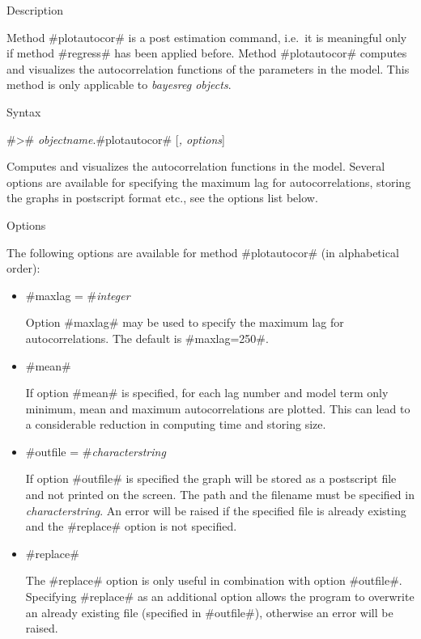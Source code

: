 \begin{stanza}{Description}

Method #plotautocor# is a post estimation command, i.e.~it is
meaningful only if method #regress# has been applied before.
Method #plotautocor# computes and visualizes the autocorrelation
functions of the parameters in the model. This method is only
applicable to {\em bayesreg objects}.

\end{stanza}

\begin{stanza}{Syntax}

#># {\em objectname}.#plotautocor# [{\em , options}]

Computes and visualizes the autocorrelation functions in the
model. Several options are available for specifying the maximum
lag for autocorrelations, storing the graphs in postscript format
etc., see the options list below.

\end{stanza}

\begin{stanza}{Options}

The following options are available for method #plotautocor# (in
alphabetical order):

\end{stanza}

\begin{itemize}
\item #maxlag = #{\em integer}

Option #maxlag# may be used to specify the maximum lag for
autocorrelations. The default is #maxlag=250#.

\item #mean#

If option #mean# is specified, for each lag number and model term
only minimum, mean and maximum autocorrelations are plotted. This
can lead to a considerable reduction in computing time and storing
size.

\item #outfile = #{\em characterstring}

If option #outfile# is specified the graph will be stored as a
postscript file and not printed on the screen. The path and the
filename must be specified in {\em characterstring}. An error will
be raised if the specified file is already existing and the
#replace# option is not specified.

\item #replace#

The #replace# option is only useful in combination with option
#outfile#. Specifying #replace# as an additional option allows the
program to overwrite an already existing file (specified in
#outfile#), otherwise an error will be raised.
\end{itemize}

